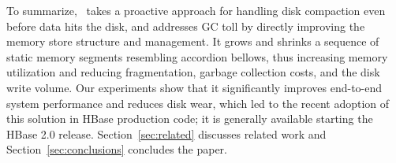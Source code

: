 To summarize, \sys\ takes a proactive approach for handling disk compaction even before data hits the disk, and addresses GC toll by directly improving the memory store structure and management.
It grows and shrinks a sequence of static memory segments resembling accordion bellows, 
thus increasing memory utilization and reducing fragmentation, garbage collection costs, and the disk write volume. 
Our experiments show that it significantly improves end-to-end system performance and reduces disk wear, 
which led to the recent adoption of this solution 
in HBase production code; it is generally available starting the HBase 2.0 release.
 Section~\ref{sec:related} discusses related work 
and Section~\ref{sec:conclusions} concludes the paper.

